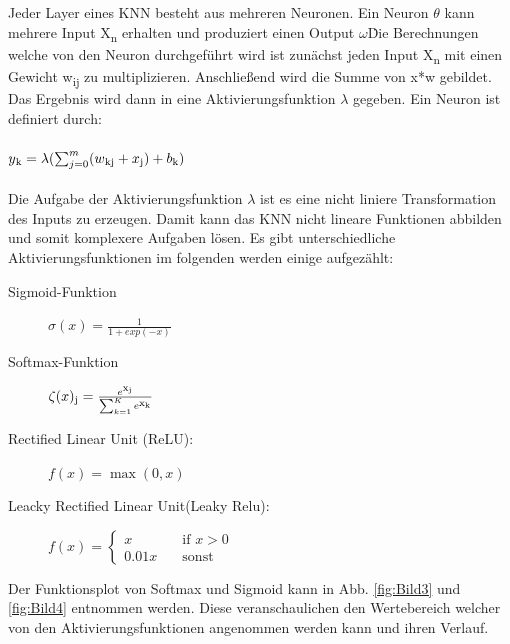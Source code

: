 \documentclass{llncs}
\begin{document}
	Jeder Layer eines KNN besteht aus mehreren Neuronen. Ein Neuron $\theta$ kann mehrere Input X\textsubscript{n} erhalten und produziert einen Output $\omega$\. Die Berechnungen welche von den Neuron durchgeführt wird ist zunächst jeden Input X\textsubscript{n} mit einen Gewicht w\textsubscript{ij} zu multiplizieren. Anschließend wird die Summe von x*w gebildet. Das Ergebnis wird dann in eine Aktivierungsfunktion $\lambda$ gegeben. Ein Neuron ist definiert durch:
	\\\\
	\begin{math}
	y\textsubscript{k} = \lambda(\sum_{j=0}^{m}(w\textsubscript{kj}+x\textsubscript{j})+b\textsubscript{k})                
	\end{math}
	\\\\
	Die Aufgabe der Aktivierungsfunktion $\lambda$  ist es eine nicht liniere Transformation des Inputs zu erzeugen. Damit kann das KNN nicht lineare Funktionen abbilden und somit komplexere Aufgaben lösen. Es gibt unterschiedliche Aktivierungsfunktionen im folgenden werden einige aufgezählt:
	\vspace{5 mm}
	\begin{description}
		\item[Sigmoid-Funktion]		
		
		\begin{math}
		\sigma(x)=\frac{1}{1+exp(-x)}
		\end{math}
		\vspace{5 mm}
		\item[Softmax-Funktion]
		
		\begin{math}
		\zeta(x)\textsubscript{j} = \frac{e\textsuperscript{x\textsubscript{j}}}{\sum_{k=1}^{K}e\textsuperscript{x\textsubscript{k}}}
		\end{math}
		\vspace{5 mm}
		\item[Rectified Linear Unit (ReLU):]
		
		\begin{math}
		f(x)=\max(0,x) 
		\end{math}
		\vspace{5 mm}
		\item[Leacky Rectified Linear Unit(Leaky Relu):]
		
		\begin{math}
		f(x) = \begin{cases}
		x  	 & \quad \text{if } x > 0\\
		0.01x & \quad \text{sonst} 
		\end{cases}
		\end{math}
		\vspace{5 mm}
	\end{description}
	\vspace{5 mm}
	Der Funktionsplot von Softmax und Sigmoid kann in  Abb. \ref{fig:Bild3} und \ref{fig:Bild4} entnommen werden. Diese veranschaulichen den Wertebereich welcher von den Aktivierungsfunktionen angenommen werden kann und ihren Verlauf. 
	
\end{document}
